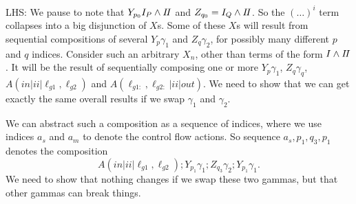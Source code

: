 LHS:
We pause to note that $Y_{p_0} I_P \land I\!I$
and $Z_{q_0} = I_Q \land I\!I$.
So the $(\dots)^i$ term collapses into a big disjunction
of $X$s.
Some of these $X$s will result from sequential compositions
of several $Y_p\gamma_1$ and $Z_q\gamma_2$, for possibly
many different $p$ and $q$ indices.
Consider such an arbitrary $X_n$, other than terms of the form $I\land I\!I$.
It will be the result of sequentially composing one or more $Y_p\gamma_1$,
$Z_q\gamma_q$, $A(in|ii|\ell_{g1},\ell_{g2})$ and $A(\ell_{g1:},\ell_{g2:}|ii|out)$.
We need to show that we can get exactly the same overall results
if we swap $\gamma_1$ and $\gamma_2$.

We can abstract such a composition as a sequence of indices,
where we use indices $a_s$ and $a_m$ to denote the control flow actions.
So sequence $a_s,p_1,q_3,p_1$
denotes the composition
\[
A(in|ii|\ell_{g1},\ell_{g2}) ; Y_{p_1}\gamma_1 ; Z_{q_3}\gamma_2 ; Y_{p_1}\gamma_1.
\]
We need to show that nothing changes if we swap these two gammas,
but that other gammas can break things.
